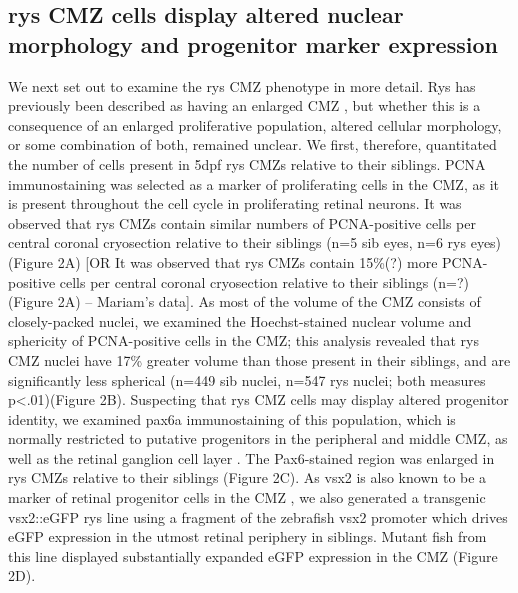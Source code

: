 \subsection{rys CMZ cells display altered nuclear morphology and progenitor marker expression}
We next set out to examine the rys CMZ phenotype in more detail. Rys has previously been described as having an enlarged CMZ \cite{Wehman2005}, but whether this is a consequence of an enlarged proliferative population, altered cellular morphology, or some combination of both, remained unclear. We first, therefore, quantitated the number of cells present in 5dpf rys CMZs relative to their siblings. PCNA immunostaining was selected as a marker of proliferating cells in the CMZ, as it is present throughout the cell cycle in proliferating retinal neurons. It was observed that rys CMZs contain similar numbers of PCNA-positive cells per central coronal cryosection relative to their siblings (n=5 sib eyes, n=6 rys eyes) (Figure 2A) [OR It was observed that rys CMZs contain 15\%(?) more PCNA-positive cells per central coronal cryosection relative to their siblings (n=?) (Figure 2A) – Mariam’s data]. As most of the volume of the CMZ consists of closely-packed nuclei, we examined the Hoechst-stained nuclear volume and sphericity of PCNA-positive cells in the CMZ; this analysis revealed that rys CMZ nuclei have 17\% greater volume than those present in their siblings, and are significantly less spherical (n=449 sib nuclei, n=547 rys nuclei; both measures p<.01)(Figure 2B). Suspecting that rys CMZ cells may display altered progenitor identity, we examined pax6a immunostaining of this population, which is normally restricted to putative progenitors in the peripheral and middle CMZ, as well as the retinal ganglion cell layer \cite{Raymond2006}. The Pax6-stained region was enlarged in rys CMZs relative to their siblings (Figure 2C). As vsx2 is also known to be a marker of retinal progenitor cells in the CMZ \cite{Raymond2006}, we also generated a transgenic vsx2::eGFP rys line using a fragment of the zebrafish vsx2 promoter which drives eGFP expression in the utmost retinal periphery in siblings. Mutant fish from this line displayed substantially expanded eGFP expression in the CMZ (Figure 2D).

